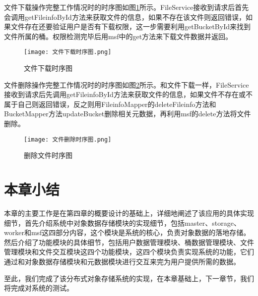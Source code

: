 文件下载操作完整工作情况时的时序图如图\ref{文件下载时序图}所示。FileService接收到请求后首先会调用getFileinfoById方法来获取文件的信息，如果不存在该文件则返回错误，如果文件存在还要验证用户是否有下载权限，这一步需要利用getBucketById来找到文件所属的桶。权限检测完毕后用msf中的get方法来下载文件数据并返回。

\begin{figure}
  \centering
  \texttt{[image: 文件下载时序图.png]}
  \caption{文件下载时序图}
  \label{文件下载时序图}
\end{figure}

文件删除操作完整工作情况时的时序图如图\ref{删除文件时序图}所示。和文件下载一样，FileService接收到请求后先调用getFileinfoById方法来获取文件的信息，如果文件不存在或不属于自己则返回错误，反之则用FileinfoMapper的deleteFileinfo方法和BucketMapper方法updateBucket删除相关元数据，再利用msf的delete方法将文件删除。

\begin{figure}
  \centering
  \texttt{[image: 文件删除时序图.png]}
  \caption{删除文件时序图}
  \label{删除文件时序图}
\end{figure}

\section{本章小结}%
本章的主要工作是在第四章的概要设计的基础上，详细地阐述了该应用的具体实现细节，首先介绍系统中对象数据存储模块的实现细节，包括master、storage、worker和msf这四部分内容，这个模块是系统的核心，负责对象数据的落地存储。然后介绍了功能模块的具体细节，包括用户数据管理模块、桶数据管理模块、文件管理模块和文件交互模块这四个功能模块，这四个模块负责实现系统的功能，它们通过和对象数据存储模块和元数据模块进行交互来完为用户提供所需的数据。

至此，我们完成了该分布式对象存储系统的实现，在本章基础上，下一章节，我们将完成对系统的测试。 
